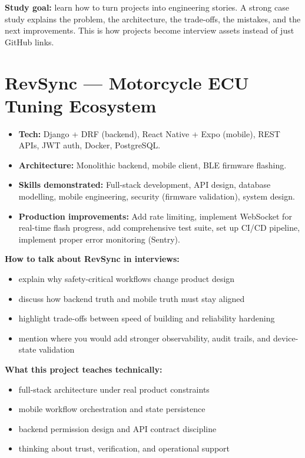 \documentclass[12pt, a4paper, oneside]{book}
\begin{document}
\begin{studybox}
\textbf{Study goal:} learn how to turn projects into engineering stories. A strong case study explains the problem, the architecture, the trade-offs, the mistakes, and the next improvements. This is how projects become interview assets instead of just GitHub links.
\end{studybox}

\section{RevSync --- Motorcycle ECU Tuning Ecosystem}
\begin{itemize}[leftmargin=2em]
    \item \textbf{Tech:} Django + DRF (backend), React Native + Expo (mobile), REST APIs, JWT auth, Docker, PostgreSQL.
    \item \textbf{Architecture:} Monolithic backend, mobile client, BLE firmware flashing.
    \item \textbf{Skills demonstrated:} Full-stack development, API design, database modelling, mobile engineering, security (firmware validation), system design.
    \item \textbf{Production improvements:} Add rate limiting, implement WebSocket for real-time flash progress, add comprehensive test suite, set up CI/CD pipeline, implement proper error monitoring (Sentry).
\end{itemize}

\textbf{How to talk about RevSync in interviews:}
\begin{itemize}[leftmargin=2em]
    \item explain why safety-critical workflows change product design
    \item discuss how backend truth and mobile truth must stay aligned
    \item highlight trade-offs between speed of building and reliability hardening
    \item mention where you would add stronger observability, audit trails, and device-state validation
\end{itemize}

\textbf{What this project teaches technically:}
\begin{itemize}[leftmargin=2em]
    \item full-stack architecture under real product constraints
    \item mobile workflow orchestration and state persistence
    \item backend permission design and API contract discipline
    \item thinking about trust, verification, and operational support
\end{itemize}
\end{document}
